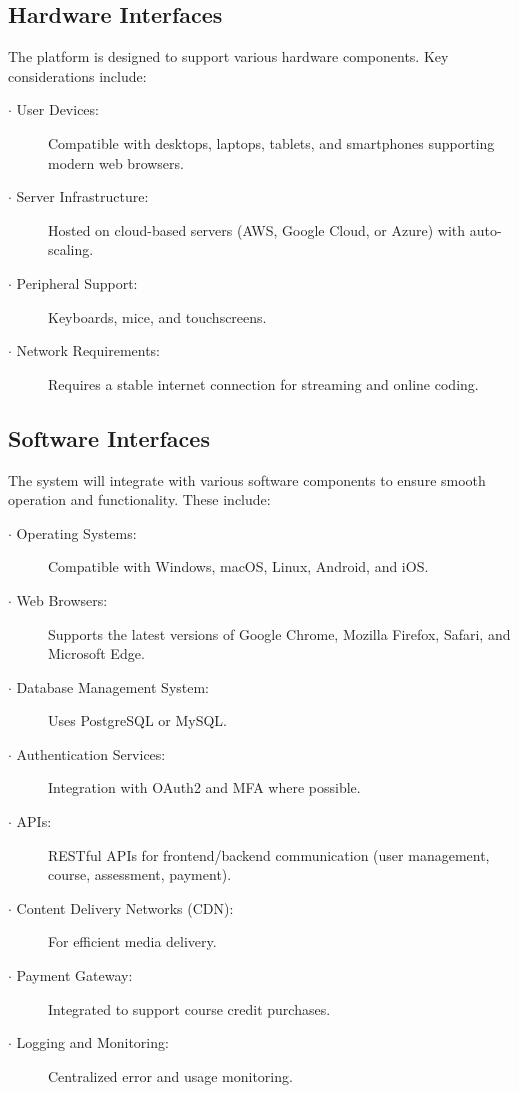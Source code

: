 \documentclass[a4paper, 11pt]{scrreprt}
\begin{document}
\subsection{Hardware Interfaces}

The platform is designed to support various hardware components. Key considerations include:

\begin{description}
    \item[$\cdot$ User Devices:] Compatible with desktops, laptops, tablets, and smartphones supporting modern web browsers.
    \item[$\cdot$ Server Infrastructure:] Hosted on cloud-based servers (AWS, Google Cloud, or Azure) with auto-scaling.
    \item[$\cdot$ Peripheral Support:] Keyboards, mice, and touchscreens.
    \item[$\cdot$ Network Requirements:] Requires a stable internet connection for streaming and online coding.
\end{description}

\subsection{Software Interfaces}

The system will integrate with various software components to ensure smooth operation and functionality. These include:

\begin{description}
    \item[$\cdot$ Operating Systems:] Compatible with Windows, macOS, Linux, Android, and iOS.
    \item[$\cdot$ Web Browsers:] Supports the latest versions of Google Chrome, Mozilla Firefox, Safari, and Microsoft Edge.
    \item[$\cdot$ Database Management System:] Uses PostgreSQL or MySQL.
    \item[$\cdot$ Authentication Services:] Integration with OAuth2 and MFA where possible.
    \item[$\cdot$ APIs:] RESTful APIs for frontend/backend communication (user management, course, assessment, payment).
    \item[$\cdot$ Content Delivery Networks (CDN):] For efficient media delivery.
    \item[$\cdot$ Payment Gateway:] Integrated to support course credit purchases.
    \item[$\cdot$ Logging and Monitoring:] Centralized error and usage monitoring.
\end{description}
\end{document}
